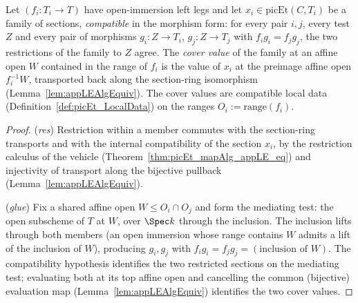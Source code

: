 \begin{definition}
  \label{def:picEt_coverValue}
  \leanok
  Let \((f_i \colon T_i \to T)\) have open-immersion left legs and let
  \(x_i \in \mathrm{picEt}(C, T_i)\) be a family of sections, \emph{compatible} in the
  morphism form: for every pair \(i, j\), every test \(Z\) and every pair of morphisms
  \(g_i \colon Z \to T_i\), \(g_j \colon Z \to T_j\) with \(f_i g_i = f_j g_j\), the two
  restrictions of the family to \(Z\) agree. The \emph{cover value} of the family at an
  affine open \(W\) contained in the range of \(f_i\) is the value of \(x_i\) at the
  preimage affine open \(f_i^{-1}W\), transported back along the section-ring isomorphism
  (Lemma~\ref{lem:appLEAlgEquiv}). The cover values are compatible local data
  (Definition~\ref{def:picEt_LocalData}) on the ranges \(O_i := \mathrm{range}(f_i)\).
\end{definition}
\begin{proof}
  \leanok
  (\emph{res}) Restriction within a member commutes with the section-ring transports and
  with the internal compatibility of the section \(x_i\), by the restriction calculus of the
  vehicle (Theorem~\ref{thm:picEt_mapAlg_appLE_eq}) and injectivity of transport along the
  bijective pullback (Lemma~\ref{lem:appLEAlgEquiv}).

  (\emph{glue}) Fix a shared affine open \(W \le O_i \cap O_j\) and form the mediating test:
  the open subscheme of \(T\) at \(W\), over \(\Spec k\) through the inclusion. The
  inclusion lifts through both members (an open immersion whose range contains \(W\) admits
  a lift of the inclusion of \(W\)), producing \(g_i, g_j\) with
  \(f_i g_i = f_j g_j = (\text{inclusion of } W)\). The compatibility hypothesis identifies
  the two restricted sections on the mediating test; evaluating both at its top affine open
  and cancelling the common (bijective) evaluation map
  (Lemma~\ref{lem:appLEAlgEquiv}) identifies the two cover values.
\end{proof}

